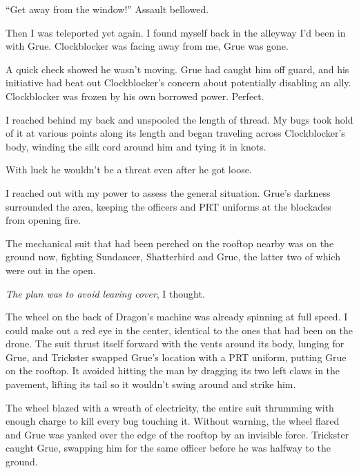 ``Get away from the window!''  Assault bellowed.



Then I was teleported yet again.  I found myself back in the alleyway I'd been in with Grue.  Clockblocker was facing away from me, Grue was gone.



A quick check showed he wasn't moving.  Grue had caught him off guard, and his initiative had beat out Clockblocker's concern about potentially disabling an ally.  Clockblocker was frozen by his own borrowed power.  Perfect.



I reached behind my back and unspooled the length of thread.  My bugs took hold of it at various points along its length and began traveling across Clockblocker's body, winding the silk cord around him and tying it in knots.



With luck he wouldn't be a threat even after he got loose.



I reached out with my power to assess the general situation. Grue's darkness surrounded the area, keeping the officers and PRT uniforms at the blockades from opening fire.



The mechanical suit that had been perched on the rooftop nearby was on the ground now, fighting Sundancer, Shatterbird and Grue, the latter two of which were out in the open.



\emph{The plan was to avoid leaving cover}, I thought.



The wheel on the back of Dragon's machine was already spinning at full speed.  I could make out a red eye in the center, identical to the ones that had been on the drone.  The suit thrust itself forward with the vents around its body, lunging for Grue, and Trickster swapped Grue's location with a PRT uniform, putting Grue on the rooftop.  It avoided hitting the man by dragging its two left claws in the pavement, lifting its tail so it wouldn't swing around and strike him.



The wheel blazed with a wreath of electricity, the entire suit thrumming with enough charge to kill every bug touching it.  Without warning, the wheel flared and Grue was yanked over the edge of the rooftop by an invisible force.  Trickster caught Grue, swapping him for the same officer before he was halfway to the ground.



